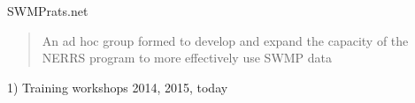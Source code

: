 \documentclass[xcolor=dvipsnames,serif]{beamer}\usepackage[]{graphicx}\usepackage[]{color}
\begin{document}
\begin{frame}{SWMPrats.net}
\begin{quote}
An ad hoc group formed to develop and expand the capacity of the NERRS program to more effectively use SWMP data 
\end{quote}
\vspace{0.2in}
1) Training workshops 2014, 2015, today \\~\\
\begin{columns}
\begin{column}{0.5\textwidth}
\centerline{}
\end{column}
\begin{column}{0.5\textwidth}
\centerline{}
\end{column}
\end{columns}
\end{frame}
\end{document}
